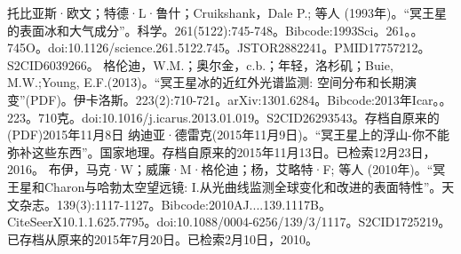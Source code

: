 \begin{enumerate}
 托比亚斯·欧文；特德·L·鲁什；Cruikshank，Dale P.; 等人 (1993年)。“冥王星的表面冰和大气成分”。科学。261(5122):745-748。Bibcode:1993Sci。261。。745O。doi:10.1126/science.261.5122.745。JSTOR2882241。PMID17757212。S2CID6039266。   
 格伦迪，W.M.；奥尔金，c.b.；年轻，洛杉矶；Buie, M.W.;Young, E.F.(2013)。“冥王星冰的近红外光谱监测: 空间分布和长期演变”(PDF)。伊卡洛斯。223(2):710-721。arXiv:1301.6284。Bibcode:2013年Icar。。223。710克。doi:10.1016/j.icarus.2013.01.019。S2CID26293543。存档自原来的(PDF)2015年11月8日  
 纳迪亚·德雷克(2015年11月9日)。“冥王星上的浮山-你不能弥补这些东西”。国家地理。存档自原来的2015年11月13日。已检索12月23日，2016。
 布伊，马克·W；威廉·M·格伦迪；杨，艾略特·F; 等人 (2010年)。“冥王星和Charon与哈勃太空望远镜: I.从光曲线监测全球变化和改进的表面特性”。天文杂志。139(3):1117-1127。Bibcode:2010AJ....139.1117B。CiteSeerX10.1.1.625.7795。doi:10.1088/0004-6256/139/3/1117。S2CID1725219。已存档从原来的2015年7月20日。已检索2月10日，2010。  
\end{enumerate}